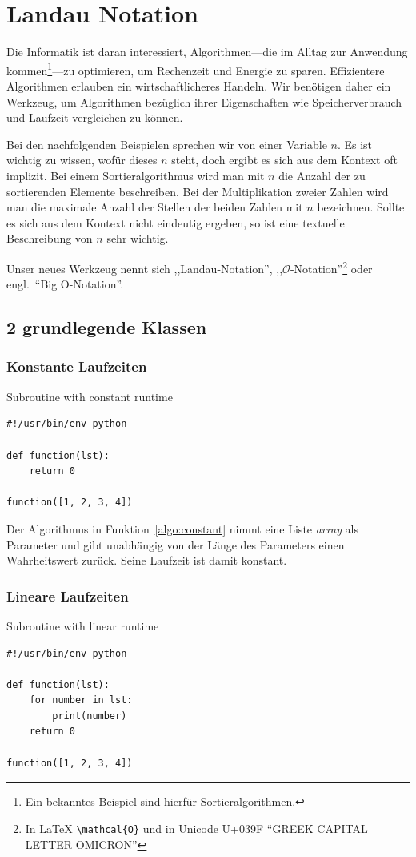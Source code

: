 \chapter{Landau Notation}
%
Die Informatik ist daran interessiert, Algorithmen---die im Alltag zur Anwendung kommen\footnote{Ein bekanntes Beispiel sind hierfür Sortieralgorithmen.}---zu optimieren, um Rechenzeit und Energie zu sparen. Effizientere Algorithmen erlauben ein wirtschaftlicheres Handeln. Wir benötigen daher ein Werkzeug, um Algorithmen bezüglich ihrer Eigenschaften wie Speicherverbrauch und Laufzeit vergleichen zu können.

Bei den nachfolgenden Beispielen sprechen wir von einer Variable $n$. Es ist wichtig zu wissen, wofür dieses $n$ steht, doch ergibt es sich aus dem Kontext oft implizit. Bei einem Sortieralgorithmus wird man mit $n$ die Anzahl der zu sortierenden Elemente beschreiben. Bei der Multiplikation zweier Zahlen wird man die maximale Anzahl der Stellen der beiden Zahlen mit $n$ bezeichnen. Sollte es sich aus dem Kontext nicht eindeutig ergeben, so ist eine textuelle Beschreibung von $n$ sehr wichtig.

Unser neues Werkzeug nennt sich ,,Landau-Notation'', ,,$\mathcal{O}$-Notation''\footnote{In \LaTeX{}  \texttt{\textbackslash mathcal\{O\}} und in Unicode U+039F ``GREEK CAPITAL LETTER OMICRON''} oder engl.~``Big O-Notation''.

\section{2 grundlegende Klassen}
\subsection{Konstante Laufzeiten}
%
\begin{algorithm}[p]
\caption{Subroutine with constant runtime}
\label{algo:constant}
\begin{lstlisting}
#!/usr/bin/env python

def function(lst):
    return 0

function([1, 2, 3, 4])
\end{lstlisting}
\end{algorithm}

Der Algorithmus in Funktion~\ref{algo:constant} nimmt eine Liste \textit{array} als Parameter und gibt unabhängig von der Länge des Parameters einen Wahrheitswert zurück. Seine Laufzeit ist damit konstant.

\subsection{Lineare Laufzeiten}
%
\begin{algorithm}[p]
\caption{Subroutine with linear runtime}
\label{algo:linear}
\begin{lstlisting}
#!/usr/bin/env python

def function(lst):
    for number in lst:
        print(number)
    return 0

function([1, 2, 3, 4])
\end{lstlisting}
\end{algorithm}

